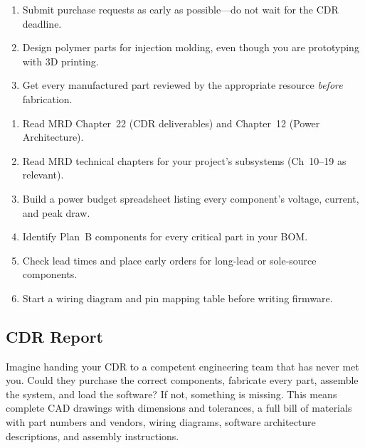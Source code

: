 \documentclass[11pt,letterpaper]{article}
\begin{document}
\begin{priorities}
\begin{enumerate}[leftmargin=*, itemsep=1pt, topsep=0pt]
    \item Submit purchase requests as early as possible---do not wait for the CDR deadline.
    \item Design polymer parts for injection molding, even though you are prototyping with 3D printing.
    \item Get every manufactured part reviewed by the appropriate resource \textit{before} fabrication.
\end{enumerate}
\end{priorities}

\begin{checklistbox}
\begin{enumerate}[leftmargin=*, itemsep=1pt, topsep=0pt]
    \item Read MRD Chapter~22 (CDR deliverables) and Chapter~12 (Power Architecture).
    \item Read MRD technical chapters for your project's subsystems (Ch~10--19 as relevant).
    \item Build a power budget spreadsheet listing every component's voltage, current, and peak draw.
    \item Identify Plan~B components for every critical part in your BOM.
    \item Check lead times and place early orders for long-lead or sole-source components.
    \item Start a wiring diagram and pin mapping table before writing firmware.
\end{enumerate}
\end{checklistbox}

\subsection{CDR Report}

\begin{faqbox}
Imagine handing your CDR to a competent engineering team that has never met you. Could they purchase the correct components, fabricate every part, assemble the system, and load the software? If not, something is missing. This means complete CAD drawings with dimensions and tolerances, a full bill of materials with part numbers and vendors, wiring diagrams, software architecture descriptions, and assembly instructions.
\end{faqbox}
\end{document}
